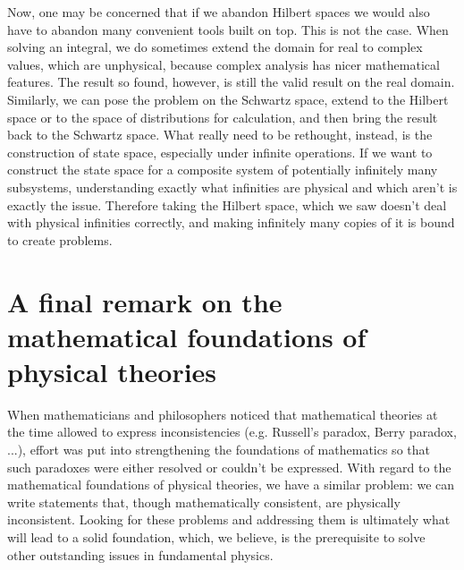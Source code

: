 \documentclass[10pt,twocolumn, nofootinbib]{revtex4-2}
\begin{document}
Now, one may be concerned that if we abandon Hilbert spaces we would also have to abandon many convenient tools built on top. This is not the case. When solving an integral, we do sometimes extend the domain for real to complex values, which are unphysical, because complex analysis has nicer mathematical features. The result so found, however, is still the valid result on the real domain. Similarly, we can pose the problem on the Schwartz space, extend to the Hilbert space or to the space of distributions for calculation, and then bring the result back to the Schwartz space. What really need to be rethought, instead, is the construction of state space, especially under infinite operations. If we want to construct the state space for a composite system of potentially infinitely many subsystems, understanding exactly what infinities are physical and which aren't is exactly the issue. Therefore taking the Hilbert space, which we saw doesn't deal with physical infinities correctly, and making infinitely many copies of it is bound to create problems.

\section{A final remark on the mathematical foundations of physical theories}

When mathematicians and philosophers noticed that mathematical theories at the time allowed to express inconsistencies (e.g. Russell's paradox, Berry paradox, ...), effort was put into strengthening the foundations of mathematics so that such paradoxes were either resolved or couldn't be expressed. With regard to the mathematical foundations of physical theories, we have a similar problem: we can write statements that, though mathematically consistent, are physically inconsistent. Looking for these problems and addressing them is ultimately what will lead to a solid foundation, which, we believe, is the prerequisite to solve other outstanding issues in fundamental physics.
\end{document}
